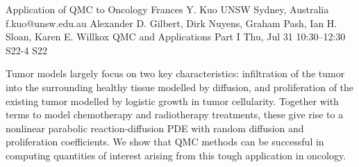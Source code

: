 \begin{talk}
  {Application of QMC to Oncology}%
  {Frances Y. Kuo}%
  {UNSW Sydney, Australia}%
  {f.kuo@unsw.edu.au}%
  {Alexander D. Gilbert, Dirk Nuyens, Graham Pash, Ian H. Sloan, Karen E. Willkox}%
  {QMC and Applications Part I}%
  {Thu, Jul 31 10:30–12:30}%
  {S22-4}%
  {S22}%
				
			
Tumor models largely focus on two key characteristics: infiltration of the tumor into the surrounding healthy tissue modelled by diffusion, and proliferation of the existing tumor modelled by logistic growth in tumor cellularity. Together with terms to model chemotherapy and radiotherapy treatments, these give rise to a nonlinear parabolic reaction-diffusion PDE with random diffusion and proliferation coefficients. We show that QMC methods can be successful in computing quantities of interest arising from this tough application in oncology.

%
%
\end{talk}

